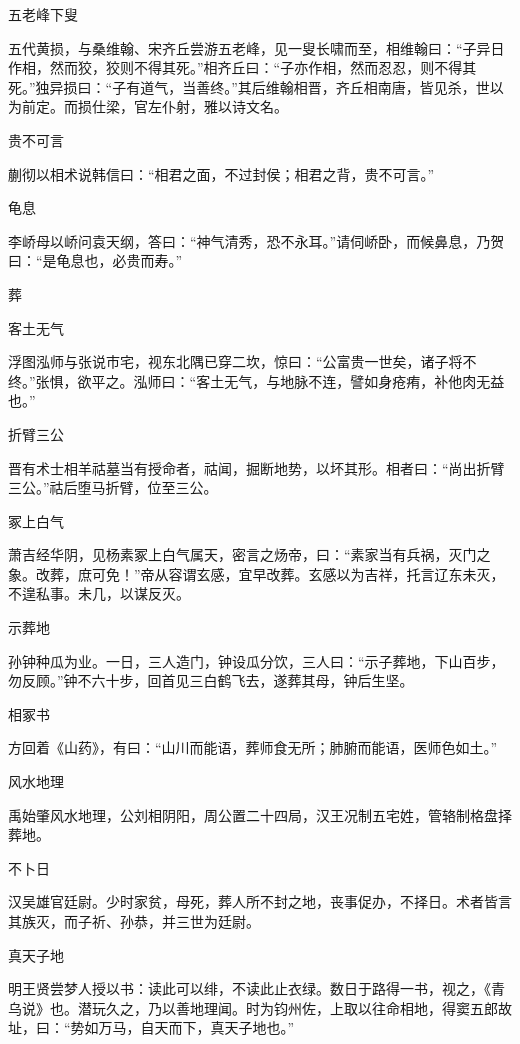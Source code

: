 \documentclass[a4paper,12pt,UTF8,twoside]{ctexbook}
\begin{document}
    五老峰下叟
    
    五代黄损，与桑维翰、宋齐丘尝游五老峰，见一叟长啸而至，相维翰曰：“子异日作相，然而狡，狡则不得其死。”相齐丘曰：“子亦作相，然而忍忍，则不得其死。”独异损曰：“子有道气，当善终。”其后维翰相晋，齐丘相南唐，皆见杀，世以为前定。而损仕梁，官左仆射，雅以诗文名。
    
    贵不可言
    
    蒯彻以相术说韩信曰：“相君之面，不过封侯；相君之背，贵不可言。”
    
    龟息
    
    李峤母以峤问袁天纲，答曰：“神气清秀，恐不永耳。”请伺峤卧，而候鼻息，乃贺曰：“是龟息也，必贵而寿。”
    
    葬
    
    客土无气
    
    浮图泓师与张说市宅，视东北隅已穿二坎，惊曰：“公富贵一世矣，诸子将不终。”张惧，欲平之。泓师曰：“客土无气，与地脉不连，譬如身疮痏，补他肉无益也。”
    
    折臂三公
    
    晋有术士相羊祜墓当有授命者，祜闻，掘断地势，以坏其形。相者曰：“尚出折臂三公。”祜后堕马折臂，位至三公。
    
    冢上白气
    
    萧吉经华阴，见杨素冢上白气属天，密言之炀帝，曰：“素家当有兵祸，灭门之象。改葬，庶可免！”帝从容谓玄感，宜早改葬。玄感以为吉祥，托言辽东未灭，不遑私事。未几，以谋反灭。
    
    示葬地
    
    孙钟种瓜为业。一日，三人造门，钟设瓜分饮，三人曰：“示子葬地，下山百步，勿反顾。”钟不六十步，回首见三白鹤飞去，遂葬其母，钟后生坚。
    
    相冢书
    
    方回着《山药》，有曰：“山川而能语，葬师食无所；肺腑而能语，医师色如土。”
    
    风水地理
    
    禹始肇风水地理，公刘相阴阳，周公置二十四局，汉王况制五宅姓，管辂制格盘择葬地。
    
    不卜日
    
    汉吴雄官廷尉。少时家贫，母死，葬人所不封之地，丧事促办，不择日。术者皆言其族灭，而子祈、孙恭，并三世为廷尉。
    
    真天子地
    
    明王贤尝梦人授以书：读此可以绯，不读此止衣绿。数日于路得一书，视之，《青乌说》也。潜玩久之，乃以善地理闻。时为钧州佐，上取以往命相地，得窦五郎故址，曰：“势如万马，自天而下，真天子地也。”
    
\end{document}
